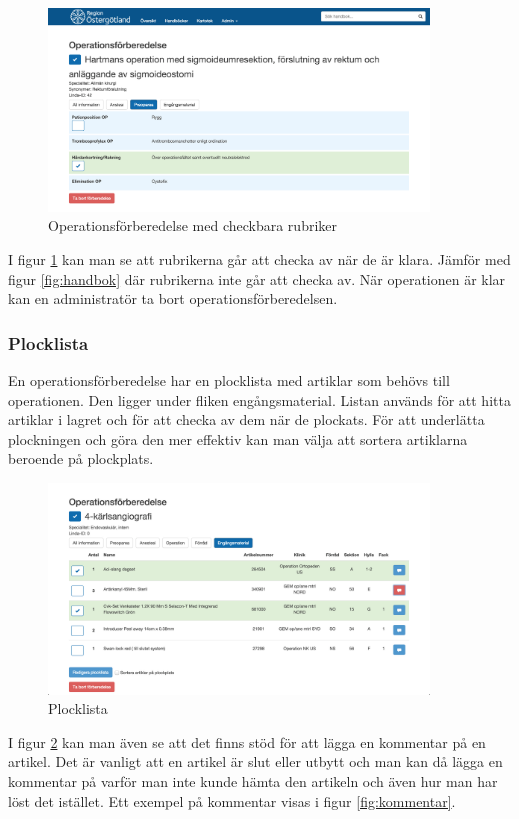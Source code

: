 \begin{figure}[h!]
  \centering
  \includegraphics[width=0.9\textwidth]{images/site/op}
  \caption{Operationsförberedelse med checkbara rubriker}
  \label{fig:op}
\end{figure}

I figur \ref{fig:op} kan man se att rubrikerna går att checka av när de är klara. Jämför med figur \ref{fig:handbok} där rubrikerna inte går att checka av. När operationen är klar kan en administratör ta bort operationsförberedelsen.
\subsubsection{Plocklista}
En operationsförberedelse har en plocklista med artiklar som behövs till operationen. Den ligger under fliken engångsmaterial.
Listan används för att hitta artiklar i lagret och för att checka av dem när de plockats. För att underlätta plockningen och göra den mer effektiv kan man välja att sortera artiklarna beroende på plockplats.

\begin{figure}[h!]
  \centering
  \includegraphics[width=0.9\textwidth]{images/site/plocklista}
  \caption{Plocklista}
  \label{fig:plocklista}
\end{figure}
I figur \ref{fig:plocklista} kan man även se att det finns stöd för att lägga en kommentar på en artikel.
Det är vanligt att en artikel är slut eller utbytt och man kan då lägga en kommentar på varför man inte kunde hämta den artikeln och även hur man har löst det istället. Ett exempel på kommentar visas i figur \ref{fig:kommentar}.

